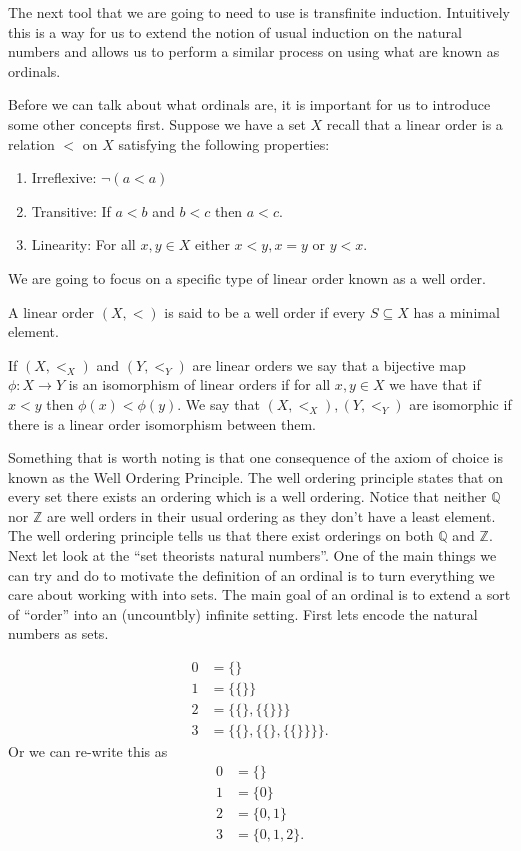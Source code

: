 The next tool that we are going to need to use is transfinite induction.
Intuitively this is a way for us to extend the notion of usual induction on the
natural numbers and allows us to perform a similar process on using what are
known as ordinals.

Before we can talk about what ordinals are, it is important for us to introduce
some other concepts first. Suppose we have a set $X$ recall that a linear order
is a relation $<$ on $X$ satisfying the following properties:
\begin{enumerate}
  \item Irreflexive: $\neg(a < a)$
  \item Transitive: If $a < b$ and $b < c$ then $a < c$.
  \item Linearity: For all $x,y \in X$ either $x < y, x = y$ or $y < x$.
\end{enumerate}

We are going to focus on a specific type of linear order known as a well order.

\begin{defn}
  A linear order $(X, <)$ is said to be a well order if every $S \subseteq X$
  has a minimal element.
\end{defn}

If $(X, <_X)$ and $(Y, <_Y)$ are linear orders we say that a bijective map
$\phi: X \to Y$ is an isomorphism of linear orders if for all $x, y \in X$ we
have that if $x < y$ then $\phi(x) < \phi(y)$. We say that $(X, <_X), (Y, <_Y)$
are isomorphic if there is a linear order isomorphism between them.

Something that is worth noting is that one consequence of the axiom of choice
is known as the Well Ordering Principle. The well ordering principle states
that on every set there exists an ordering which is a well ordering. Notice
that neither $\mathbb{Q}$ nor $\mathbb{Z}$ are well orders in their usual
ordering as they don't have a least element. The well ordering principle tells
us that there exist orderings on both $\mathbb{Q}$ and $\mathbb{Z}$.\\

Next let look at the ``set theorists natural numbers''. One of the main things we
can try and do to motivate the definition of an ordinal is to turn everything
we care about working with into sets. The main goal of an ordinal is to
extend a sort of ``order'' into an (uncountbly) infinite setting. First lets
encode the natural numbers as sets.

\begin{align*}
  0 &= \{\} \\
  1 &= \{\{\}\} \\
  2 &= \{\{\}, \{\{\}\}\} \\
  3 &= \{\{\}, \{\{\}, \{\{\} \}\}\} 
.\end{align*}
Or we can re-write this as
\begin{align*}
  0 &= \{\} \\
  1 &= \{0\} \\
  2 &= \{0,1\} \\
  3 &= \{0,1,2\} 
.\end{align*}

